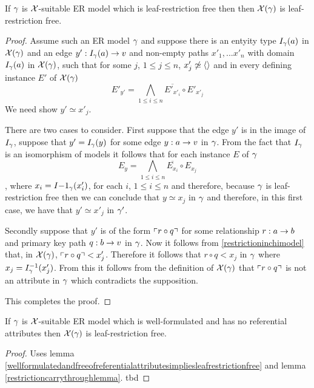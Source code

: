\begin{lemma}
If $\gamma$ is $\mathcal{X}$-suitable ER model which is leaf-restriction free then
then $\mathcal{X}(\gamma)$ is leaf-restriction free.
\end{lemma}
\begin{proof}
Assume such an ER model $\gamma$ and suppose there is an entyity type $I_\gamma(a)$ in $\mathcal{X}(\gamma)$ and an edge $y': I_\gamma(a) \rightarrow v$ and non-empty paths $x'_1,...x'_n$   with domain $I_\gamma(a)$ in $\mathcal{X}(\gamma)$,  such that for some $j$, $1 \leq j \leq n$, $x'_j \not\simeq \langle\rangle$ and in every defining instance $E'$ of $\mathcal{X}(\gamma)$  
\begin{equation}
\label{restrictioninchimodel}
E'_{y'} = \bigwedge_{1 \leq i \leq n}{\overline{E'_{x'_i}}} \circ E'_{x'_j}
\end{equation}
We need show  $y' \simeq x'_j$.

There are two cases to consider. First suppose that the edge $y'$ is in the image of $I_\gamma$, suppose that $y'=I_\gamma(y)$ for some edge
$y:a \rightarrow v$ in $\gamma$. From the fact that $I_\gamma$ is an isomorphism of models it follows that for each instance $E$ of  $\gamma$
$$E_{y} = \bigwedge_{1 \leq i \leq n}{\overline{E_{x_i}}} \circ E_{x_j}$$,
where $x_i=I{-1}_\gamma(x'_i)$, for each $i$, $1 \leq i \leq n$ and therefore, because $\gamma$ is leaf-restriction free then we can conclude that
$y \simeq x_j$ in $\gamma$ and therefore, in this first case, we have that $y' \simeq x'_j$ in $\gamma'$.


Secondly suppose that $y'$ is of the form $\left\ulcorner r \circ q\right\urcorner$ for some relationship $r: a \rightarrow b$ and primary key path $q :b \rightarrow v$ in $\gamma$.
Now it follows from \ref{restrictioninchimodel} that, in $\mathcal{X}(\gamma)$, $\left\ulcorner r \circ q\right\urcorner < x'_j$. Therefore  
it follows that $r \circ q < x_j$ in $\gamma$  where $x_j= I^{-1}_\gamma(x'_j)$. From this it follows from the definition of $\mathcal{X}(\gamma)$ that
 $\left\ulcorner r \circ q\right\urcorner$ is not an attribute in $\gamma$ which contradicts the supposition. 

This completes the proof.
\end{proof}

\begin{lemma}
If $\gamma$ is $\mathcal{X}$-suitable ER model which is well-formulated and has no referential attributes 
then $\mathcal{X}(\gamma)$ is leaf-restriction free.
\end{lemma}
\begin{proof}
Uses lemma  \ref{wellformulatedandfreeofreferentialattributesimpliesleafrestrictionfree} and lemma \ref{restrictioncarrythroughlemma}. 
\vspace{0.5cm}
tbd
\end{proof}

